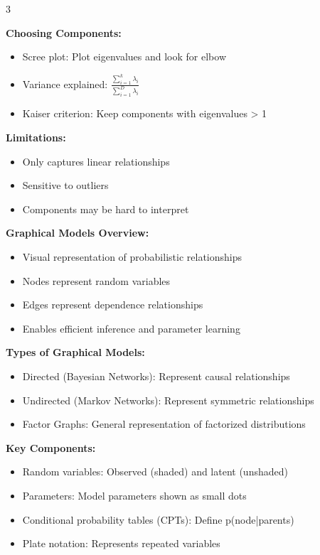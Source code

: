 \documentclass[10pt,landscape]{article}
\begin{document}
\begin{multicols}{3}
\begin{tcolorbox}[breakable, title=7.1 Principal Component Analysis (PCA), colback=dimension]
\textbf{Choosing Components:}
\begin{itemize}[leftmargin=*,noitemsep,topsep=0pt]
    \item Scree plot: Plot eigenvalues and look for elbow
    \item Variance explained: $\frac{\sum_{i=1}^k \lambda_i}{\sum_{i=1}^D \lambda_i}$
    \item Kaiser criterion: Keep components with eigenvalues > 1
\end{itemize}

\textbf{Limitations:}
\begin{itemize}[leftmargin=*,noitemsep,topsep=0pt]
    \item Only captures linear relationships
    \item Sensitive to outliers
    \item Components may be hard to interpret
\end{itemize}
\end{tcolorbox}

\begin{tcolorbox}[breakable, title=8. Graphical Models Concepts, colback=graphical]
\textbf{Graphical Models Overview:}
\begin{itemize}[leftmargin=*,noitemsep,topsep=0pt]
    \item Visual representation of probabilistic relationships
    \item Nodes represent random variables
    \item Edges represent dependence relationships
    \item Enables efficient inference and parameter learning
\end{itemize}

\textbf{Types of Graphical Models:}
\begin{itemize}[leftmargin=*,noitemsep,topsep=0pt]
    \item Directed (Bayesian Networks): Represent causal relationships
    \item Undirected (Markov Networks): Represent symmetric relationships
    \item Factor Graphs: General representation of factorized distributions
\end{itemize}

\textbf{Key Components:}
\begin{itemize}[leftmargin=*,noitemsep,topsep=0pt]
    \item Random variables: Observed (shaded) and latent (unshaded)
    \item Parameters: Model parameters shown as small dots
    \item Conditional probability tables (CPTs): Define p(node|parents)
    \item Plate notation: Represents repeated variables
\end{itemize}


\end{tcolorbox}
\end{multicols}
\end{document}
